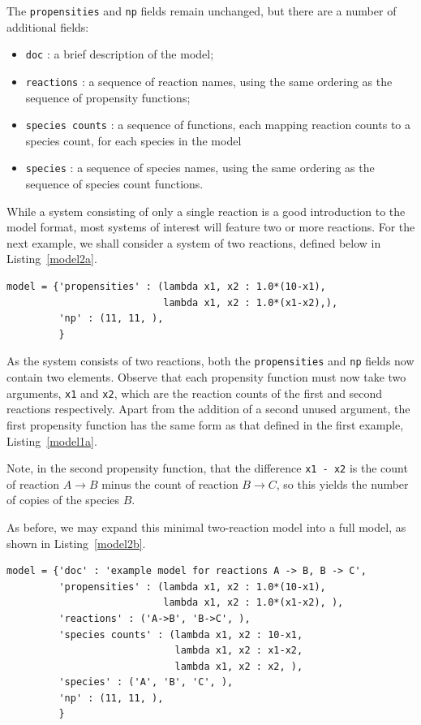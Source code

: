 \documentclass{article}
\newcommand{\mono}[1]{\texttt{#1}}
\newcommand{\lstref}[1]{Listing~\ref{#1}}
\begin{document}
The \mono{propensities} and \mono{np} fields remain unchanged, but there are
a number of additional fields:
\begin{itemize}
  \item \mono{doc} : a brief description of the model;
  \item \mono{reactions} : a sequence of reaction names, using the same
  ordering as the sequence of propensity functions;
  \item \mono{species counts} : a sequence of functions, each mapping
  reaction counts to a species count, for each species in the model
  \item \mono{species} : a sequence of species names, using the same ordering
  as the sequence of species count functions.
\end{itemize}

While a system consisting of only a single reaction is a good introduction
to the model format, most systems of interest will feature two or more
reactions.
For the next example, we shall consider a system of two reactions,
defined below in \lstref{model2a}.

 \begin{lstlisting}[frame=tb,
caption={A minimal model definition for the system
$A \rightarrow B$, $B \rightarrow C$.},
label=model2a]
model = {'propensities' : (lambda x1, x2 : 1.0*(10-x1),
                           lambda x1, x2 : 1.0*(x1-x2),),
         'np' : (11, 11, ),
         }
\end{lstlisting}

As the system consists of two reactions, both the \mono{propensities} and
\mono{np} fields now contain two elements. Observe that each propensity function
must now take two arguments, \mono{x1} and \mono{x2}, which are the reaction counts
of the first and second reactions respectively. Apart from the addition
of a second unused argument, the first propensity function has the same form
as that defined in the first example, \lstref{model1a}.

Note, in the second propensity function, that the difference \mono{x1 - x2} is
the count of reaction $A \rightarrow B$ minus the count of reaction
$B \rightarrow C$, so this yields the number of copies of the species $B$.

As before, we may expand this minimal two-reaction model into a full model,
as shown in \lstref{model2b}.

\begin{lstlisting}[frame=tb,
caption={A full model definition for the system
$A \rightarrow B$, $B \rightarrow C$.},
label=model2b]
model = {'doc' : 'example model for reactions A -> B, B -> C',
         'propensities' : (lambda x1, x2 : 1.0*(10-x1),
                           lambda x1, x2 : 1.0*(x1-x2), ),
         'reactions' : ('A->B', 'B->C', ),
         'species counts' : (lambda x1, x2 : 10-x1,
                             lambda x1, x2 : x1-x2,
                             lambda x1, x2 : x2, ),
         'species' : ('A', 'B', 'C', ),
         'np' : (11, 11, ),
         }
\end{lstlisting}
\end{document}
